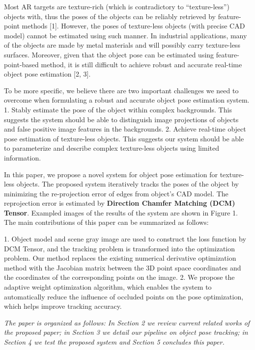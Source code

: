 \documentclass{cta-author}
\begin{document}
Most AR targets are texture-rich (which is contradictory to “texture-less”) objects with, 
thus the poses of the objects can be reliably retrieved by feature-point methods [1]. However, 
the poses of texture-less objects (with precise CAD model) cannot be estimated using such manner. 
In industrial applications, many of the objects are made by metal materials and will possibly carry 
texture-less surfaces. Moreover, given that the object pose can be estimated using feature-point-based 
method, it is still difficult to achieve robust and accurate real-time object pose estimation [2, 3].

To be more specific, we believe there are two important challenges we need to overcome when 
formulating a robust and accurate object pose estimation system.
1.  Stably estimate the pose of the object within complex backgrounds. This suggests the system 
should be able to distinguish image projections of 
objects and false positive image features in the backgrounds.
2.	Achieve real-time object pose estimation of texture-less objects. This suggests our 
system should be able to parameterize and describe complex texture-less objects using limited information. 

In this paper, we propose a novel system for object pose estimation for texture-less objects. The proposed 
system iteratively tracks the poses of the object by minimizing the re-projection error of edges 
from object’s CAD model. The reprojection error is estimated by \textbf{Direction Chamfer Matching (DCM) Tensor}.
 Exampled images of the results of the system are shown in Figure 1. 
The main contributions of this paper can be summarized as follows:

1.	Object model and scene gray image are used to construct the loss function by DCM Tensor, 
and the tracking problem is transformed into the optimization problem. Our method replaces the existing 
numerical derivative optimization method with the Jacobian matrix between the 
3D point space coordinates and the coordinates of the corresponding points on the image.
2.	We propose the adaptive weight optimization algorithm, which enables the system to automatically 
reduce the influence of occluded points on the pose optimization, which helps improve tracking accuracy.

\emph{The paper is organized as follows: In Section 2 we review current related works of the 
proposed paper; in Section 3 we detail our pipeline on object pose 
tracking; in Section 4 we test the proposed system and Section 5 concludes this paper.}
\end{document}
